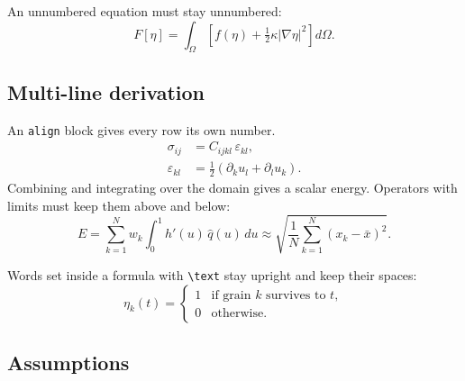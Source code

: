 \documentclass[pdflatex]{sn-jnl}
\newcommand{\order}{\eta}
\begin{document}
An unnumbered equation must stay unnumbered:
\begin{equation*}
  F[\order] = \int_\Omega \left[ f(\order) + \tfrac{1}{2}\kappa|\nabla\order|^2 \right] d\Omega .
\end{equation*}

\subsection{Multi-line derivation}\label{sec:theory:derivation}

An \verb|align| block gives every row its own number.
\begin{align}
  \sigma_{ij} &= C_{ijkl}\,\varepsilon_{kl}, \label{eq:hooke}\\
  \varepsilon_{kl} &= \frac{1}{2}\left(\partial_k u_l + \partial_l u_k\right). \label{eq:strain}
\end{align}
Combining  and integrating over the domain gives a
scalar energy. Operators with limits must keep them above and below:
\begin{equation}
  E = \sum_{k=1}^{N} w_k \int_0^1 h'(u)\,\hat{q}(u)\,du
  \approx \sqrt{\frac{1}{N}\sum_{k=1}^{N}\left(x_k-\bar{x}\right)^2}.
  \label{eq:energy}
\end{equation}

Words set inside a formula with \verb|\text| stay upright and keep their spaces:
\begin{equation}
  \order_k(t) = \begin{cases}
    1 & \text{if grain } k \text{ survives to } t,\\
    0 & \text{otherwise.}
  \end{cases}
\end{equation}

\subsection{Assumptions}
\end{document}
